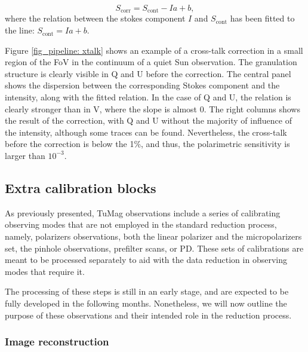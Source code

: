 \begin{equation}
  S_{\text{corr}} = S_{\text{cont}} - I a + b,
\end{equation}
where the relation between the stokes component $I$ and $S_{\text{cont}}$ has been fitted to the line: $S_{\text{cont}} =  I a + b$.

Figure \ref{fig_pipeline: xtalk} shows an example of a cross-talk correction in a small region of the FoV in the continuum of a quiet Sun observation. The granulation structure is clearly visible in Q and U before the correction. The central panel shows the dispersion between the corresponding Stokes component and the intensity, along with the fitted relation. In the case of Q and U, the relation is clearly stronger than in V, where the slope is almost 0. The right columns shows the result of the correction, with Q and U without the majority of influence of the intensity, although some traces can be found. Nevertheless, the cross-talk before the correction is below the 1\%, and thus, the polarimetric sensitivity is larger than $10^{-3}$.
\subsection{Extra calibration blocks}

As previously presented, TuMag observations include a series of calibrating observing modes that are not employed in the standard reduction process, namely, polarizers observations, both the linear polarizer and the micropolarizers set, the pinhole observations, prefilter scans, or PD. These sets of calibrations are meant to be processed separately to aid with the data reduction in observing modes that require it.

The processing of these steps is still in an early stage, and are expected to be fully developed in the following months. Nonetheless, we will now outline the purpose of these observations and their intended role in the reduction process.
\subsubsection{Image reconstruction}

